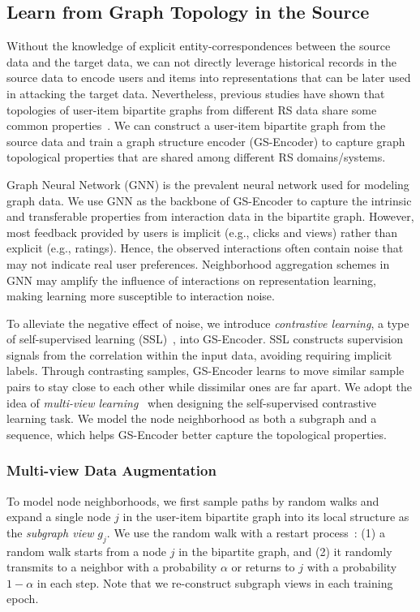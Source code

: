 \subsection{Learn from Graph Topology in the Source}

Without the knowledge of explicit entity-correspondences between the source data and the target data, we can not directly leverage historical records in the source data to encode users and items into representations that can be later used in attacking the target data.
Nevertheless, previous studies have shown that topologies of user-item bipartite graphs from different RS data share some common properties~\citep{HuangZ11}.
We can construct a user-item bipartite graph from the source data and train a graph structure encoder (GS-Encoder) to capture graph topological properties that are shared among different RS domains/systems.


Graph Neural Network (GNN) is the prevalent neural network used for modeling graph data. 
We use GNN as the backbone of GS-Encoder to capture the intrinsic and transferable properties from interaction data in the bipartite graph.
However, most feedback provided by users is implicit (e.g., clicks and views) rather than explicit (e.g., ratings).
Hence, the observed interactions often contain noise that may not indicate real user preferences. 
Neighborhood aggregation schemes in GNN may amplify the influence of interactions on representation learning, making learning more susceptible to interaction noise.

To alleviate the negative effect of noise, we introduce \emph{contrastive learning}, a type of self-supervised learning (SSL)~\citep{LiuZGNWZT21}, into GS-Encoder.
SSL constructs supervision signals from the correlation within the input data, avoiding requiring implicit labels.
Through contrasting samples, GS-Encoder learns to move similar sample pairs to stay close to each other while dissimilar ones are far apart.
We adopt the idea of \emph{multi-view learning}~\citep{abs-2103-00111} when designing the self-supervised contrastive learning task.
We model the node neighborhood as both a subgraph and a sequence, which helps GS-Encoder better capture the topological properties. 


\subsubsection{Multi-view Data Augmentation}
To model node neighborhoods, we first sample paths by random walks and expand a single node $j$ in the user-item bipartite graph into its local structure as the \emph{subgraph view} $g_j$.
We use the random walk with a restart process~\citep{TongFP06}: (1) a random walk starts from a node $j$ in the bipartite graph, and (2) it randomly transmits to a neighbor with a probability $\alpha$ or returns to $j$ with a probability $1- \alpha$ in each step.
Note that we re-construct subgraph views in each training epoch.


